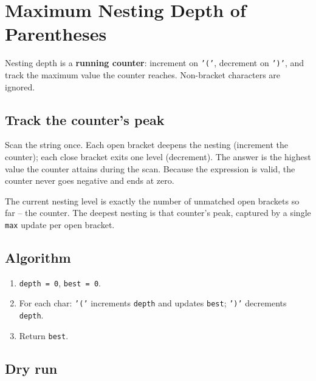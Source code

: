 \section{Maximum Nesting Depth of Parentheses}
\label{sec:str-max-nesting-depth}


\begin{patternbox}
Nesting depth is a \textbf{running counter}: increment on \texttt{'('},
decrement on \texttt{')'}, and track the maximum value the counter reaches.
Non-bracket characters are ignored.
\end{patternbox}

\subsection*{Track the counter's peak}

Scan the string once. Each open bracket deepens the nesting (increment the
counter); each close bracket exits one level (decrement). The answer is the
highest value the counter attains during the scan. Because the expression is
valid, the counter never goes negative and ends at zero.

\begin{ideabox}
The current nesting level is exactly the number of unmatched open brackets
so far -- the counter. The deepest nesting is that counter's peak, captured
by a single \texttt{max} update per open bracket.
\end{ideabox}

\subsection*{Algorithm}

\begin{enumerate}
  \item \texttt{depth = 0}, \texttt{best = 0}.
  \item For each char: \texttt{'('} increments \texttt{depth} and updates
        \texttt{best}; \texttt{')'} decrements \texttt{depth}.
  \item Return \texttt{best}.
\end{enumerate}

\subsection*{Dry run}

